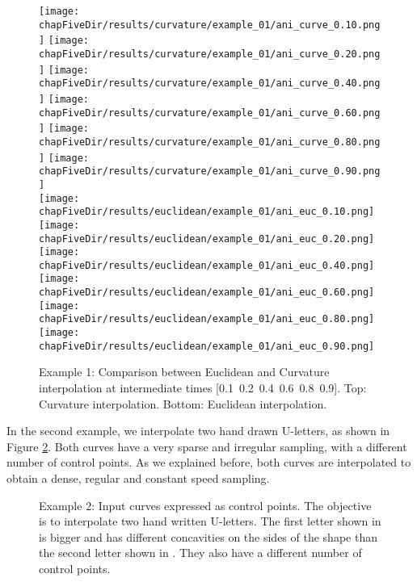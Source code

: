 \documentclass{ipol}
\newcommand{\chapFiveDir}{images/chapter_05a}
\begin{document}
\begin{figure}[h]
	\centering
	\texttt{[image: \\chapFiveDir/results/curvature/example\_01/ani\_curve\_0.10.png]}
	\texttt{[image: \\chapFiveDir/results/curvature/example\_01/ani\_curve\_0.20.png]}
	\texttt{[image: \\chapFiveDir/results/curvature/example\_01/ani\_curve\_0.40.png]}
	\texttt{[image: \\chapFiveDir/results/curvature/example\_01/ani\_curve\_0.60.png]}
	\texttt{[image: \\chapFiveDir/results/curvature/example\_01/ani\_curve\_0.80.png]}
	\texttt{[image: \\chapFiveDir/results/curvature/example\_01/ani\_curve\_0.90.png]}\\
	\texttt{[image: \\chapFiveDir/results/euclidean/example\_01/ani\_euc\_0.10.png]}
	\texttt{[image: \\chapFiveDir/results/euclidean/example\_01/ani\_euc\_0.20.png]}
	\texttt{[image: \\chapFiveDir/results/euclidean/example\_01/ani\_euc\_0.40.png]}
	\texttt{[image: \\chapFiveDir/results/euclidean/example\_01/ani\_euc\_0.60.png]}
	\texttt{[image: \\chapFiveDir/results/euclidean/example\_01/ani\_euc\_0.80.png]}
	\texttt{[image: \\chapFiveDir/results/euclidean/example\_01/ani\_euc\_0.90.png]}
	\caption{Example 1: Comparison between Euclidean and Curvature interpolation at intermediate times \mbox{[0.1 0.2 0.4 0.6 0.8 0.9]}. Top: Curvature interpolation. Bottom: Euclidean interpolation.}
	\label{fig:curve_interpolation:results:parametric:animation}
\end{figure}	


In the second example, we interpolate two hand drawn U-letters, as shown in Figure \ref{fig:curve_interpolation:results:letter_u:input}. Both curves have a very sparse and irregular sampling, with a different number of control points. As we explained before, both curves are interpolated to obtain a dense, regular and constant speed sampling.

\begin{figure}[h]
	\centering
	\caption{Example 2: Input curves expressed as control points. The objective is to interpolate two hand written U-letters. The first letter shown in \protect{} is bigger and has different concavities on the sides of the shape than the second letter shown in \protect{}. They also have a different number of control points. }
	\label{fig:curve_interpolation:results:letter_u:input}
\end{figure}	
\end{document}
